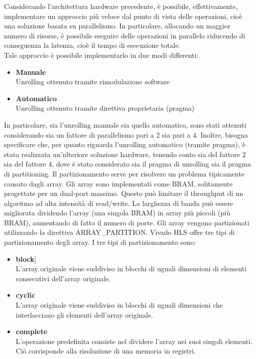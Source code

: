 Considerando l'architettura hardware precedente, è possibile, effettivamente, implementare un approccio più veloce dal punto di vista delle operazioni, cioè una soluzione basata su parallelismo. In particolare, allocando un maggior numero di risorse, è possibile eseguire delle operazioni in parallelo riducendo di conseguenza la latenza, cioè il tempo di esecuzione totale.
\\
Tale approccio è possibile implementarlo in due modi differenti:
\begin{itemize}
    \item \textbf{Manuale}\\Unrolling ottenuto tramite rimodulazione software
    \item \textbf{Automatico}\\Unrolling ottenuto tramite direttiva proprietaria (pragma)
\end{itemize}

In particolare, sia l'unrolling manuale sia quello automatico, sono stati ottenuti considerando sia un fattore di parallelismo pari a 2 sia pari a 4. Inoltre, bisogna specificare che, per quanto riguarda l'unrolling automatico (tramite pragma), è stata realizzata un'ulteriore soluzione hardware, tenendo conto sia del fattore 2 sia del fattore 4, dove è stato considerato sia il pragma di unrolling sia il pragma di partitioning. Il partizionamento serve per risolvere un problema tipicamente causato dagli array. Gli array sono implementati come BRAM, solitamente progettate per un dual-port massimo. Questo può limitare il throughput di un algoritmo ad alta intensità di read/write. La larghezza di banda può essere migliorata dividendo l'array (una singola BRAM) in array più piccoli (più BRAM), aumentando di fatto il numero di porte. Gli array vengono partizionati utilizzando la direttiva ARRAY\_PARTITION. Vivado HLS offre tre tipi di partizionamento degli array. I tre tipi di partizionamento sono:
\begin{itemize}
    \item \textbf{block}]\\L'array originale viene suddiviso in blocchi di uguali dimensioni di elementi consecutivi dell'array originale.
    \item \textbf{cyclic}\\L'array originale viene suddiviso in blocchi di uguali dimensioni che interlacciano gli elementi dell'array originale.
    \item \textbf{complete}\\L'operazione predefinita consiste nel dividere l'array nei suoi singoli elementi. Ciò corrisponde alla risoluzione di una memoria in registri.
\end{itemize}

